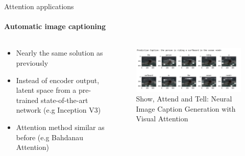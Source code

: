 \documentclass{beamer}
\begin{document}
\begin{frame}{Attention applications}
\framesubtitle{Automatic image captioning}

\begin{columns}
\begin{column}{0.4\textwidth}
    \begin{itemize}
    \item Nearly the same solution as previously
    
    \item Instead of encoder output, latent space from a pre-trained state-of-the-art network (e.g Inception V3)
    
    \item Attention method similar as before (e.g Bahdanau Attention)
    
    \end{itemize}   
\end{column}
\begin{column}{0.7\textwidth}  %
\begin{figure}
\includegraphics[width = .9\textwidth]{images/automatic-captions.png}
\caption{Show, Attend and Tell: Neural Image Caption Generation with Visual Attention\cite{image-caption}}
\end{figure}{}
\end{column}
\end{columns}
    
\end{frame}
\end{document}
